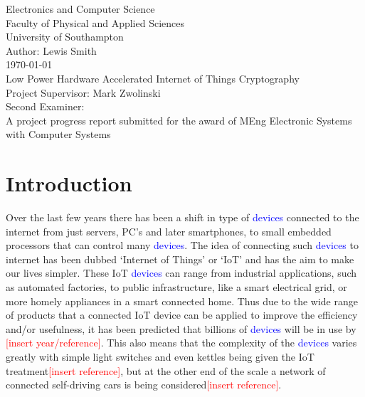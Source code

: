 \documentclass[12pt,twoside,a4paper]{report}
\begin{document}
    
    \begin{titlepage}
    \begin{center}
        \Huge
        Electronics and Computer Science
        \\Faculty of Physical and Applied Sciences
        \\University of Southampton
        \Large
        \\[4cm]Author: Lewis Smith
        \\[1cm]\today
        \Huge
        \\[2cm]Low Power Hardware Accelerated Internet of Things Cryptography
        \large
        \\[4cm]Project Supervisor: Mark Zwolinski
        \\Second Examiner:
        \\[4cm]A project progress report submitted for the award of MEng Electronic Systems with Computer Systems
        
    \end{center}
    \end{titlepage}
    \thispagestyle{empty}
    \cleardoublepage
    
    \begin{abstract}
    
    \lipsum[1-2]
    
    \end{abstract}
    
    \tableofcontents
    
    \chapter{Introduction}
    \label{chapter:intro}
    Over the last few years there has been a shift in type of \textcolor{blue}{devices} connected to the internet from just servers, PC's and later smartphones, to small embedded processors that can control many \textcolor{blue}{devices}. The idea of connecting such \textcolor{blue}{devices} to internet has been dubbed `Internet of Things' or `IoT' and has the aim to make our lives simpler. These IoT \textcolor{blue}{devices} can range from industrial applications, such as automated factories, to public infrastructure, like a smart electrical grid, or more homely appliances in a smart connected home. Thus due to the wide range of products that a connected IoT device can be applied to improve the efficiency and/or usefulness, it has been predicted that billions of \textcolor{blue}{devices} will be in use by \textcolor{red}{[insert year/reference]}. This also means that the complexity of the \textcolor{blue}{devices} varies greatly with simple light switches and even kettles being given the IoT treatment\textcolor{red}{[insert reference]}, but at the other end of the scale a network of connected self-driving cars is being considered\textcolor{red}{[insert reference]}.
    
\end{document}
